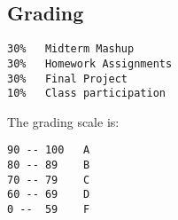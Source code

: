 \documentclass[11pt,twocolumn]{article}
\begin{document}
\subsection*{Grading}


\begin{verbatim}
30%   Midterm Mashup
30%   Homework Assignments
30%   Final Project
10%   Class participation
\end{verbatim}

The grading scale is:

\begin{verbatim}
90 -- 100   A
80 -- 89    B
70 -- 79    C
60 -- 69    D
0 --  59    F
\end{verbatim}
\end{document}
